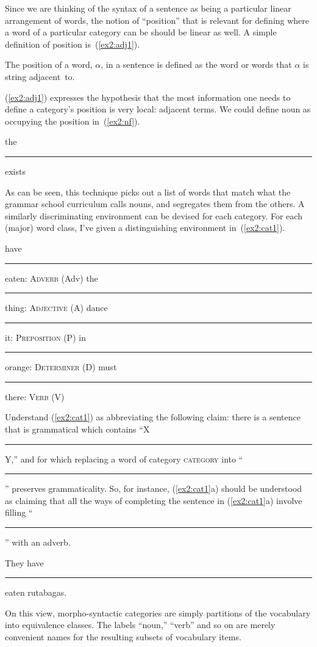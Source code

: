 Since we are thinking of the syntax of a sentence as being a particular linear arrangement of words, the notion of ``position'' that is relevant for defining where a word of a particular category can be should be linear as well. A simple definition of position is~(\ref{ex2:adj1}).
\begin{exe}
	\raggedright
	\ex \label{ex2:adj1} The position of a word, $\alpha$, in a sentence is defined as the word or words that $\alpha$ is string adjacent~to. 
\end{exe}
(\ref{ex2:adj1}) expresses the hypothesis that the most information one needs to define a category's position is very local: adjacent terms. We could  define noun as occupying the position in~(\ref{ex2:nf}).
\begin{exe}
	\raggedright
	\ex \label{ex2:nf} 
	the \rule{5mm}{.1mm} exists
\end{exe}
As can be seen, this technique picks out a list of words that match what the grammar school curriculum calls nouns, and segregates them from the others. A similarly discriminating environment can be devised for each category. For each (major) word class, I've given a distinguishing environment in~(\ref{ex2:cat1}). 
\pagebreak
\begin{exe}
\ex \label{ex2:cat1} 
\begin{xlist}
	\ex have \rule{5mm}{.1mm} eaten: \textsc{Adverb} (Adv)
	\ex the \rule{5mm}{.1mm} thing: \textsc{Adjective} (A)
	\ex dance \rule{5mm}{.1mm} it: \textsc{Preposition} (P)
	\ex in \rule{5mm}{.1mm} orange: \textsc{Determiner} (D)
	\ex must \rule{5mm}{.1mm} there: \textsc{Verb} (V)
\end{xlist}
\end{exe}
Understand (\ref{ex2:cat1}) as abbreviating the following claim: there is a sentence that is grammatical which contains ``X \rule{5mm}{.1mm} Y,'' and for which replacing a word of category \textsc{category} into ``\rule{5mm}{.1mm}'' preserves grammaticality. So, for instance, (\ref{ex2:cat1}a) should be understood as claiming that all the ways of completing the sentence in (\ref{ex2:cat1}a) involve filling ``\rule{5mm}{.1mm}'' with an adverb.
\begin{exe}
\ex \label{ex2:cat1a} They have \rule{5mm}{.1mm} eaten rutabagas.
\end{exe}
On this view, morpho-syntactic categories are simply partitions of the vocabulary into equivalence classes. The labels ``noun,'' ``verb'' and so on are merely convenient names for the resulting subsets of vocabulary items.

